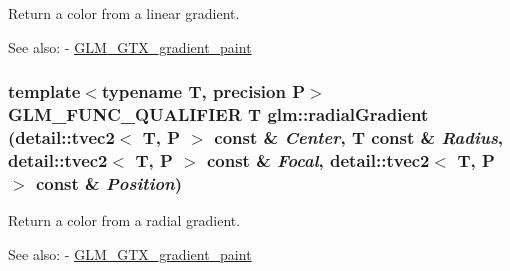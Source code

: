 Return a color from a linear gradient. \begin{Desc}
\item[See also:]- \hyperlink{group__gtx__gradient__paint}{GLM\_\-GTX\_\-gradient\_\-paint} \end{Desc}
\hypertarget{group__gtx__gradient__paint_g5e9373dad017d6547ce8db966d02394e}{
\subsubsection[radialGradient]{\setlength{\rightskip}{0pt plus 5cm}template$<$typename T, precision P$>$ GLM\_\-FUNC\_\-QUALIFIER T glm::radialGradient (detail::tvec2$<$ T, P $>$ const \& {\em Center}, \/  T const \& {\em Radius}, \/  detail::tvec2$<$ T, P $>$ const \& {\em Focal}, \/  detail::tvec2$<$ T, P $>$ const \& {\em Position})}}
\label{group__gtx__gradient__paint_g5e9373dad017d6547ce8db966d02394e}


Return a color from a radial gradient. \begin{Desc}
\item[See also:]- \hyperlink{group__gtx__gradient__paint}{GLM\_\-GTX\_\-gradient\_\-paint} \end{Desc}
